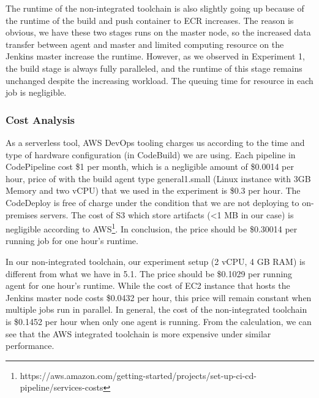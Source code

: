  \par
 The runtime of the non-integrated toolchain is also slightly going up because of the runtime of the build and push container to ECR increases. The reason is obvious, we have these two stages runs on the master node, so the increased data transfer between agent and master and limited computing resource on the Jenkins master increase the runtime. However, as we observed in Experiment 1, the build stage is always fully paralleled, and the runtime of this stage remains unchanged despite the increasing workload. The queuing time for resource in each job is negligible.
 \subsubsection{Cost Analysis}
 As a serverless tool, AWS DevOps tooling charges us according to the time and type of hardware configuration (in CodeBuild) we are using.
  Each pipeline in CodePipeline cost \$1 per month, which is a negligible amount of \$0.0014 per hour, price of with the build agent type general1.small (Linux instance with 3GB Memory and two vCPU) that we used in the experiment is \$0.3 per hour. The CodeDeploy is free of charge under the condition that we are not deploying to on-premises servers. The cost of S3 which store artifacts (<1 MB in our case) is negligible according to AWS\footnote{https://aws.amazon.com/getting-started/projects/set-up-ci-cd-pipeline/services-costs}. In conclusion, the price should be \$0.30014 per running job for one hour's runtime.
  \par
  In our non-integrated toolchain, our experiment setup (2 vCPU, 4 GB RAM) is different from what we have in 5.1. The price should be \$0.1029 per running agent for one hour's runtime. While the cost of EC2 instance that hosts the Jenkins master node costs \$0.0432 per hour, this price will remain constant when multiple jobs run in parallel. In general, the cost of the non-integrated toolchain is \$0.1452 per hour when only one agent is running.
From the calculation, we can see that the AWS integrated toolchain is more expensive under similar performance.
